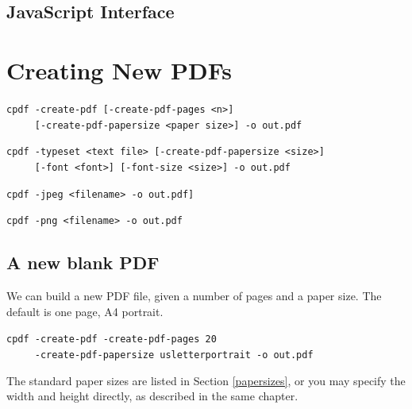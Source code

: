 \documentclass{book}
\begin{document}
\begin{jscpdflib}
\clearpage
\section*{JavaScript Interface}
\begin{small}\tt

\end{small}
\end{jscpdflib}

\clearpage\pagestyle{empty}
\chapter{Creating New PDFs}\label{chap:17}\pagestyle{fancy}

  {\small\begin{framed}
  \noindent\verb!cpdf -create-pdf [-create-pdf-pages <n>]!\\
  \noindent\verb!     [-create-pdf-papersize <paper size>] -o out.pdf!

  \vspace{1.5mm}
  \noindent\verb!cpdf -typeset <text file> [-create-pdf-papersize <size>]!\\
  \noindent\verb!     [-font <font>] [-font-size <size>] -o out.pdf!

  \vspace{1.5mm}
  \noindent\verb!cpdf -jpeg <filename> -o out.pdf]!

  \vspace{1.5mm}
  \noindent\verb!cpdf -png <filename> -o out.pdf!

  \end{framed}}

\section{A new blank PDF}

We can build a new PDF file, given a number of pages and a paper size. The default is one page, A4 portrait.

\begin{framed}
 \noindent\small\verb?cpdf -create-pdf -create-pdf-pages 20?\\
 \noindent\small\verb?     -create-pdf-papersize usletterportrait -o out.pdf?
\end{framed}

\noindent The standard paper sizes are listed in Section \ref{papersizes}, or you may specify the width and height directly, as described in the same chapter.
\end{document}
